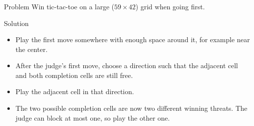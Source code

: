 \begin{frame}
    \frametitle{\problemtitle}
    \begin{block}{Problem}
        Win tic-tac-toe on a large ($59\times42$) grid when going first.
    \end{block}
    \begin{block}{Solution}
        \begin{itemize}
            \item<+-> Play the first move somewhere with enough space around it, for example near the center.
            \item<+-> After the judge's first move, choose a direction such that the adjacent cell and both completion cells are still free.
            \item<+-> Play the adjacent cell in that direction.
            \item<+-> The two possible completion cells are now two different winning threats. The judge can block at most one, so play the other one.
        \end{itemize}
    \end{block}
\end{frame}
